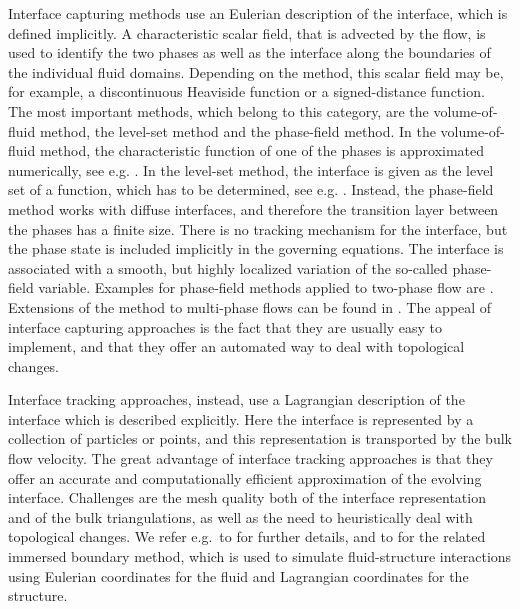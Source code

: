 \documentclass[a4paper,12pt,onecolumn]{article}
\begin{document}
Interface capturing methods use an Eulerian description of the interface, which
is defined implicitly. A characteristic scalar field,
that is advected by the flow, is used to identify
the two phases as well as the interface along the boundaries of the individual
fluid domains. Depending on the method, this scalar field may be, for example,
a discontinuous Heaviside function or a signed-distance function. The most
important methods, which belong to this category, are
the volume-of-fluid method, the level-set method and the phase-field method.
In the volume-of-fluid method, the characteristic
function of one of the phases is approximated numerically, see e.g.
\cite{HirtN81,RenardyR02,Popinet09}. In the level-set method, the interface is
given as the level set of a function, which has to be determined, see e.g.
\cite{SussmanSO94,Sethian99,OsherF03,GrossR07,GrossR11,Svacek17}. Instead, the
phase-field method works with diffuse interfaces, and therefore the transition
layer between the phases has a finite size. There is no tracking mechanism for
the interface, but the phase state is included implicitly in the governing
equations. The interface is associated with a smooth, but highly localized
variation of the so-called phase-field variable.
Examples for phase-field methods applied to two-phase flow are
\cite{HohenbergH77,AndersonMW98,LowengrubT98,Boyer02,Feng06,DingSS07,%
KaySW08,AbelsGG12,AlandV12,GrunK14,GarckeHK16}.
Extensions of the method to multi-phase flows
can be found in \cite{Dong14,Dong15,BoyerM14,BanasN17}.
The appeal of interface capturing approaches is the fact that they are usually
easy to implement, and that they offer an automated way to deal with
topological changes.

Interface tracking approaches, instead, use a Lagrangian description of the
interface which is described explicitly. Here the interface is represented
by a collection of particles or points, and this representation is
transported by the bulk flow velocity.
The great
advantage of interface tracking approaches is that they offer an accurate and
computationally efficient approximation of the evolving interface.
Challenges are the mesh quality both of the interface representation and of the
bulk triangulations, as well as the need to heuristically deal with topological
changes.
We refer e.g.\ to
\cite{UnverdiT92,Bansch01,Tryggvason_etal01,GanesanT08,spurious,
fluidfbp} for further details, and to \cite{LevequeL97,Peskin02} for the
related immersed boundary method, which is used to simulate fluid-structure
interactions using Eulerian coordinates for the fluid and Lagrangian
coordinates for the structure.
\end{document}
